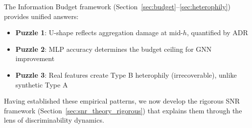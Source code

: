 The Information Budget framework (Section~\ref{sec:budget}--\ref{sec:heterophily}) provides unified answers:
\begin{itemize}
    \item \textbf{Puzzle 1}: U-shape reflects aggregation damage at mid-$h$, quantified by ADR
    \item \textbf{Puzzle 2}: MLP accuracy determines the budget ceiling for GNN improvement
    \item \textbf{Puzzle 3}: Real features create Type B heterophily (irrecoverable), unlike synthetic Type A
\end{itemize}

Having established these empirical patterns, we now develop the rigorous SNR framework (Section~\ref{sec:snr_theory_rigorous}) that explains them through the lens of discriminability dynamics.
